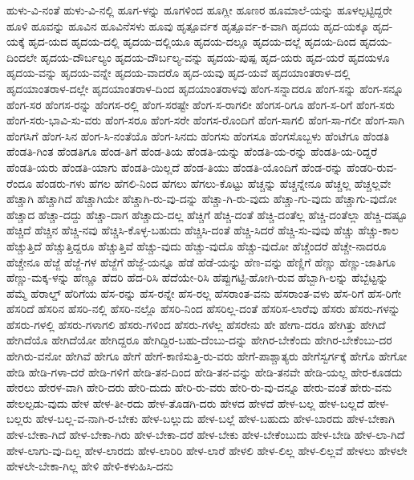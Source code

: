 {ಹುಳು-ವಿ-ನಂತೆ
ಹುಳು-ವಿ-ನಲ್ಲಿ
ಹೂಗ-ಳನ್ನು
ಹೂಗಳಿಂದ
ಹೂಗ್ಲೀ
ಹೂಣರ
ಹೂಮಾಲೆ-ಯನ್ನು
ಹೂಳಲ್ಪಟ್ಟಿದ್ದರೇ
ಹೂಳಿ
ಹೂವನ್ನು
ಹೂವಿನ
ಹೂವಿನೆಸಳು
ಹೂವು
ಹೃತ್ಪೂರ್ವಕ
ಹೃತ್ಪೂರ್ವ-ಕ-ವಾಗಿ
ಹೃದಯ
ಹೃದ-ಯಕ್ಕೂ
ಹೃದ-ಯಕ್ಕೆ
ಹೃದ-ಯದ
ಹೃದಯ-ದಲ್ಲಿ
ಹೃದಯ-ದಲ್ಲಿಯೂ
ಹೃದಯ-ದಲ್ಲೂ
ಹೃದಯ-ದಲ್ಲೆ
ಹೃದಯ-ದಿಂದ
ಹೃದಯ-ದಿಂದಲೇ
ಹೃದಯ-ದೌರ್ಬಲ್ಯಂ
ಹೃದಯ-ದೌರ್ಬಲ್ಯ-ವನ್ನು
ಹೃದಯ-ಪುಷ್ಪ
ಹೃದ-ಯರು
ಹೃದ-ಯರೆ
ಹೃದಯಳೂ
ಹೃದಯ-ವನ್ನು
ಹೃದಯ-ವನ್ನೇ
ಹೃದಯ-ವಾದರೊ
ಹೃದ-ಯವು
ಹೃದ-ಯವೆ
ಹೃದಯಾಂತರಾಳ-ದಲ್ಲಿ
ಹೃದಯಾಂತರಾಳ-ದಲ್ಲೇ
ಹೃದಯಾಂತರಾಳ-ದಿಂದ
ಹೃದಯಾಂತರಾಳವು
ಹೆಂಗ-ಸನ್ನಾದರೂ
ಹೆಂಗ-ಸನ್ನು
ಹೆಂಗ-ಸನ್ನೂ
ಹೆಂಗ-ಸರ
ಹೆಂಗಸ-ರನ್ನು
ಹೆಂಗಸ-ರಲ್ಲಿ
ಹೆಂಗ-ಸರಷ್ಟೇ
ಹೆಂಗ-ಸ-ರಾಗಲೀ
ಹೆಂಗಸ-ರಿಗೂ
ಹೆಂಗ-ಸ-ರಿಗೆ
ಹೆಂಗ-ಸರು
ಹೆಂಗ-ಸರು-ಭಾವಿ-ಸು-ವರು
ಹೆಂಗ-ಸರೂ
ಹೆಂಗ-ಸರೇ
ಹೆಂಗಸ-ರೊಂದಿಗೆ
ಹೆಂಗ-ಸಾಗಲಿ
ಹೆಂಗ-ಸಾ-ಗಲೀ
ಹೆಂಗ-ಸಾಗಿ
ಹೆಂಗಸಿಗೆ
ಹೆಂಗ-ಸಿನ
ಹೆಂಗ-ಸಿ-ನಂತೆಯೊ
ಹೆಂಗ-ಸಿನದು
ಹೆಂಗಸು
ಹೆಂಗಸೂ
ಹೆಂಗಸೊಬ್ಬಳು
ಹೆಂಟೆಗೂ
ಹೆಂಡತಿ
ಹೆಂಡತಿ-ಗಿಂತ
ಹೆಂಡತಿಗೂ
ಹೆಂಡ-ತಿಗೆ
ಹೆಂಡ-ತಿಯ
ಹೆಂಡತಿ-ಯನ್ನು
ಹೆಂಡತಿ-ಯ-ರನ್ನು
ಹೆಂಡತಿ-ಯ-ರಿದ್ದರೆ
ಹೆಂಡತಿ-ಯರು
ಹೆಂಡತಿ-ಯಾಗು
ಹೆಂಡತಿ-ಯಿಲ್ಲದೆ
ಹೆಂಡ-ತಿಯು
ಹೆಂಡತಿ-ಯೊಂದಿಗೆ
ಹೆಂಡ-ರನ್ನು
ಹೆಂಡರಿ-ರುವ-ರೆಂದೂ
ಹೆಂಡರು-ಗಳು
ಹೆಗಲ
ಹೆಗಲಿ-ನಿಂದ
ಹೆಗಲು
ಹೆಗಲು-ಕೊಟ್ಟು
ಹೆಚ್ಚನ್ನು
ಹೆಚ್ಚನ್ನೇನೂ
ಹೆಚ್ಚಲ್ಲ
ಹೆಚ್ಚಲ್ಲವೇ
ಹೆಚ್ಚಾಗಿ
ಹೆಚ್ಚಾಗಿದೆ
ಹೆಚ್ಚಾಗಿಯೇ
ಹೆಚ್ಚಾಗಿ-ರು-ವು-ದನ್ನು
ಹೆಚ್ಚಾ-ಗಿ-ರು-ವುದು
ಹೆಚ್ಚಾ-ಗು-ವುದು
ಹೆಚ್ಚಾಗು-ವುದೋ
ಹೆಚ್ಚಾದ
ಹೆಚ್ಚಾ-ದದ್ದು
ಹೆಚ್ಚಾ-ದಾಗ
ಹೆಚ್ಚಾದು-ದಲ್ಲ
ಹೆಚ್ಚಿಗೆ
ಹೆಚ್ಚಿ-ದಂತೆ
ಹೆಚ್ಚಿ-ದಂತೆಲ್ಲ
ಹೆಚ್ಚಿ-ದಂತೆಲ್ಲಾ
ಹೆಚ್ಚಿ-ದಷ್ಟೂ
ಹೆಚ್ಚಿದೆ
ಹೆಚ್ಚಿನ
ಹೆಚ್ಚಿ-ನವು
ಹೆಚ್ಚಿಸಿ-ಕೊಳ್ಳ-ಬಹುದು
ಹೆಚ್ಚಿಸಿ-ದಂತೆ
ಹೆಚ್ಚಿ-ಸಿದರೆ
ಹೆಚ್ಚಿ-ಸು-ವುವು
ಹೆಚ್ಚು
ಹೆಚ್ಚು-ಕಾಲ
ಹೆಚ್ಚುತ್ತಿದೆ
ಹೆಚ್ಚುತ್ತಿದ್ದರೂ
ಹೆಚ್ಚುತ್ತಿವೆ
ಹೆಚ್ಚು-ವುದು
ಹೆಚ್ಚು-ವುದೊ
ಹೆಚ್ಚು-ವುದೋ
ಹೆಚ್ಚೆಂದರೆ
ಹೆಚ್ಚೇ-ನಾದರೂ
ಹೆಚ್ಚೇನೂ
ಹೆಜ್ಜೆ
ಹೆಜ್ಜೆ-ಗಳ
ಹೆಜ್ಜೆಗೆ
ಹೆಜ್ಜೆ-ಯನ್ನೂ
ಹೆಡೆ
ಹೆಡೆ-ಯನ್ನು
ಹೆಣ-ವನ್ನು
ಹೆಣ್ಣಿಗೆ
ಹೆಣ್ಣು
ಹೆಣ್ಣು-ಜಾತಿಗೂ
ಹೆಣ್ಣು-ಮಕ್ಕ-ಳನ್ನು
ಹೆಣ್ಣೂ
ಹೆದರಿ
ಹೆದ-ರಿಸಿ
ಹೆದೆಯೇ-ರಿಸಿ
ಹೆಪ್ಪುಗಟ್ಟಿ-ಹೋಗಿ-ರುವ
ಹೆಬ್ಬಾಗಿ-ಲನ್ನು
ಹೆಬ್ಬೆಟ್ಟನ್ನು
ಹೆಮ್ಮೆ
ಹೆರಾಲ್ಡ್
ಹೆರಿಗೆಯ
ಹೆಸ-ರನ್ನು
ಹೆಸ-ರನ್ನೇ
ಹೆಸ-ರಲ್ಲ
ಹೆಸರಾಂತ-ವನು
ಹೆಸರಾಂತ-ವಳು
ಹೆಸ-ರಿಗೆ
ಹೆಸ-ರಿಗೇ
ಹೆಸರಿದೆ
ಹೆಸರಿನ
ಹೆಸರಿ-ನಲ್ಲಿ
ಹೆಸರಿ-ನಲ್ಲೊ
ಹೆಸರಿ-ನಿಂದ
ಹೆಸರಿಲ್ಲ-ದಂತೆ
ಹೆಸರಿಸ-ಲಾರೆವು
ಹೆಸರು
ಹೆಸರು-ಗಳನ್ನು
ಹೆಸರು-ಗಳಲ್ಲಿ
ಹೆಸರು-ಗಳಾಗಲಿ
ಹೆಸರು-ಗಳಿಂದ
ಹೆಸರು-ಗಳೆಲ್ಲ
ಹೆಸರೇನು
ಹೇ
ಹೇಗಾ-ದರೂ
ಹೇಗಿತ್ತು
ಹೇಗಿದೆ
ಹೇಗಿದೆಯೊ
ಹೇಗಿದೆಯೋ
ಹೇಗಿದ್ದರೂ
ಹೇಗಿದ್ದಿರ-ಬಹು-ದೆಂಬು-ದನ್ನು
ಹೇಗಿರ-ಬೇಕೆಂದು
ಹೇಗಿರ-ಬೇಕೆಂಬು-ದರ
ಹೇಗಿರು-ವನೋ
ಹೇಗಿವೆ
ಹೇಗೂ
ಹೇಗೆ
ಹೇಗೆ-ಕಾಣಿಸುತ್ತಿ-ರು-ವರು
ಹೇಗೆ-ಪಾಶ್ಚಾತ್ಯರು
ಹೇಗೆಸ್ವರ್ಗಕ್ಕೆ
ಹೇಗೊ
ಹೇಗೋ
ಹೇಡಿ
ಹೇಡಿ-ಗಳಾ-ದರೆ
ಹೇಡಿ-ಗಳಿಗೆ
ಹೇಡಿ-ತನ-ದಿಂದ
ಹೇಡಿ-ತನ-ವನ್ನು
ಹೇಡಿ-ತನವೇ
ಹೇಡಿ-ಯಲ್ಲ
ಹೇರ-ಕೂಡದು
ಹೇರಲು
ಹೇರಳ-ವಾಗಿ
ಹೇರಿ-ದರು
ಹೇರಿ-ದುದು
ಹೇರಿ-ರು-ವರು
ಹೇರಿ-ರು-ವು-ದನ್ನೂ
ಹೇರು-ವಂತೆ
ಹೇರು-ವನು
ಹೇಲಲ್ಪಡು-ವುದು
ಹೇಳ
ಹೇಳ-ತೀ-ರದು
ಹೇಳ-ತೊಡಗಿ-ದರು
ಹೇಳದ
ಹೇಳದೆ
ಹೇಳ-ಬಲ್ಲ
ಹೇಳ-ಬಲ್ಲದೆ
ಹೇಳ-ಬಲ್ಲರು
ಹೇಳ-ಬಲ್ಲ-ವ-ನಾಗಿ-ರ-ಬೇಕು
ಹೇಳ-ಬಲ್ಲುದು
ಹೇಳ-ಬಲ್ಲೆ
ಹೇಳ-ಬಹುದು
ಹೇಳ-ಬಾರದು
ಹೇಳ-ಬೇಕಾಗಿ
ಹೇಳ-ಬೇಕಾ-ಗಿದೆ
ಹೇಳ-ಬೇಕಾ-ಗಿರು
ಹೇಳ-ಬೇಕಾ-ದರೆ
ಹೇಳ-ಬೇಕು
ಹೇಳ-ಬೇಕೆಂಬುದು
ಹೇಳ-ಬೇಡಿ
ಹೇಳ-ಲಾ-ಗಿದೆ
ಹೇಳ-ಲಾಗು-ವು-ದಿಲ್ಲ
ಹೇಳ-ಲಾರದು
ಹೇಳ-ಲಾರಿರಿ
ಹೇಳ-ಲಾರೆ
ಹೇಳಲಿ
ಹೇಳ-ಲಿಲ್ಲ
ಹೇಳ-ಲಿಲ್ಲವೆ
ಹೇಳಲು
ಹೇಳಲೇ
ಹೇಳಲೇ-ಬೇಕಾ-ಗಿಲ್ಲ
ಹೇಳಿ
ಹೇಳಿ-ಕಳುಹಿಸಿ-ದನು
}
